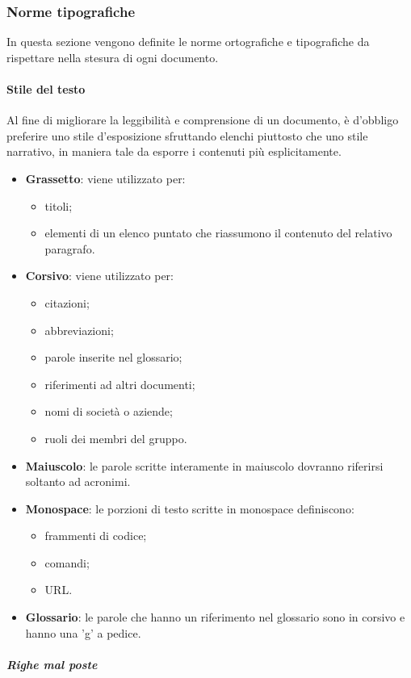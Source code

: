 \subsubsection{Norme tipografiche}
In questa sezione vengono definite le norme ortografiche e tipografiche da rispettare nella stesura di ogni documento.
 \paragraph{Stile del testo}
 Al fine di migliorare la leggibilità e comprensione di un documento, è d'obbligo preferire uno stile d'esposizione sfruttando elenchi piuttosto che uno stile narrativo, in maniera tale da esporre i contenuti più esplicitamente.	
\begin{itemize}
	\item \textbf{Grassetto}: viene utilizzato per:
	\begin{itemize}
		\item titoli;
		\item elementi di un elenco puntato che riassumono il contenuto del relativo paragrafo.
	\end{itemize}
	\item \textbf{Corsivo}: viene utilizzato per:
	\begin{itemize}
		\item citazioni;
		\item abbreviazioni;
		\item parole inserite nel glossario;
		\item riferimenti ad altri documenti;
		\item nomi di società o aziende;
		\item ruoli dei membri del gruppo.
	\end{itemize}
	\item \textbf{Maiuscolo}: le parole scritte interamente in maiuscolo dovranno riferirsi soltanto ad acronimi.
	\item \textbf{Monospace}: le porzioni di testo scritte in monospace definiscono:
	\begin{itemize}
		\item frammenti di codice;
		\item comandi;
		\item URL.
	\end{itemize}
	\item \textbf{Glossario}: le parole che hanno un riferimento nel glossario sono in corsivo e hanno una 'g' a pedice.
\end{itemize}
\subparagraph{Righe mal poste}
